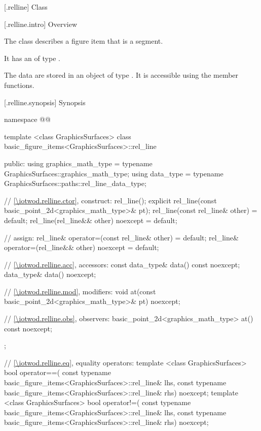  [\iotwod.relline] {Class }

 [\iotwod.relline.intro] {Overview}

\pnum
{}%
The class  describes a figure item that is a segment.

\pnum
It has an  of type .

\pnum
The data are stored in an object of type . It is accessible using the  member functions.

 [\iotwod.relline.synopsis] {Synopsis}
\begin{codeblock}
namespace @\fullnamespace{}@ {
  template <class GraphicsSurfaces>
  class basic_figure_items<GraphicsSurfaces>::rel_line {
  public:
    using graphics_math_type = typename GraphicsSurfaces::graphics_math_type;
    using data_type =
      typename GraphicsSurfaces::paths::rel_line_data_type;

    // \ref{\iotwod.relline.ctor}, construct:
    rel_line();
    explicit rel_line(const basic_point_2d<graphics_math_type>& pt);
    rel_line(const rel_line& other) = default;
    rel_line(rel_line&& other) noexcept = default;

    // assign:
    rel_line& operator=(const rel_line& other) = default;
    rel_line& operator=(rel_line&& other) noexcept = default;

    // \ref{\iotwod.relline.acc}, accessors:
    const data_type& data() const noexcept;
    data_type& data() noexcept;

    // \ref{\iotwod.relline.mod}, modifiers:
    void at(const basic_point_2d<graphics_math_type>& pt) noexcept;

    // \ref{\iotwod.relline.obs}, observers:
    basic_point_2d<graphics_math_type> at() const noexcept;
  };
  
  // \ref{\iotwod.relline.eq}, equality operators:
  template <class GraphicsSurfaces>
  bool operator==(
    const typename basic_figure_items<GraphicsSurfaces>::rel_line& lhs,
    const typename basic_figure_items<GraphicsSurfaces>::rel_line& rhs) 
    noexcept;  
  template <class GraphicsSurfaces>
  bool operator!=(
    const typename basic_figure_items<GraphicsSurfaces>::rel_line& lhs,
    const typename basic_figure_items<GraphicsSurfaces>::rel_line& rhs) 
    noexcept;  
}
\end{codeblock}

